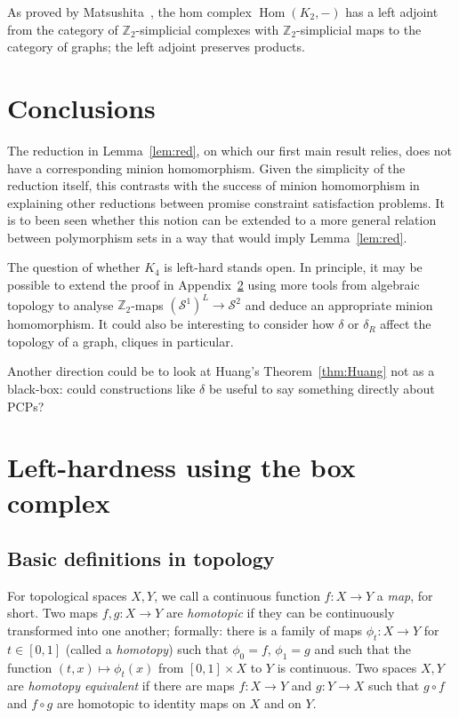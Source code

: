 \documentclass[11pt,a4paper]{scrartcl}
\numberwithin{theorem}{section}
\theoremstyle{definition}
\newcommand{\ZZ}{\mathbb{Z}}
\newcommand\Sphere{\mathcal{S}}
\DeclareMathOperator{\Hom}{Hom}
\begin{document}
As proved by Matsushita~\cite{Matsushita17}, the hom complex $\Hom(K_2,-)$ has a left adjoint from the category of $\ZZ_2$-simplicial complexes with $\ZZ_2$-simplicial maps to the category of graphs; the left adjoint preserves products.

\section{Conclusions}
The reduction in Lemma~\ref{lem:red}, on which our first main result relies, does not have a corresponding minion homomorphism.
Given the simplicity of the reduction itself, this contrasts with the success of minion homomorphism in explaining other reductions between promise constraint satisfaction problems.
It is to been seen whether this notion can be extended to a more general relation between polymorphism sets in a way that would imply Lemma~\ref{lem:red}.

The question of whether $K_4$ is left-hard stands open.
In principle, it may be possible to extend the proof in Appendix~\ref{app:topo} using more tools from algebraic topology to analyse $\ZZ_2$-maps $(\Sphere^1)^L \to \Sphere^2$ and deduce an appropriate minion homomorphism.
It could also be interesting to consider how $\delta$ or $\delta_R$ affect the topology of a graph, cliques in particular.

Another direction could be to look at Huang's Theorem~\ref{thm:Huang} not as a black-box: could constructions like $\delta$ be useful to say something directly about PCPs?


\appendix%
\section{Left-hardness using the box complex}\label{app:topo}
\subsection*{Basic definitions in topology}
For topological spaces $X,Y$, we call a continuous function $f: X \to Y$ a \emph{map}, for short. 
Two maps $f,g: X \to Y$ are \emph{homotopic} if they can be continuously transformed into one another; formally: there is a family of maps $\phi_t: X \to Y$ for $t\in [0,1]$ (called a \emph{homotopy}) such that $\phi_0 = f$, $\phi_1=g$ and such that the function $(t,x) \mapsto \phi_t(x)$ from $[0,1] \times X$ to $Y$ is continuous.
Two spaces $X,Y$ are \emph{homotopy equivalent} if there are maps $f:X \to Y$ and $g: Y \to X$ such that $g \circ f$ and $f \circ g$ are homotopic to identity maps on $X$ and on $Y$.
\end{document}
